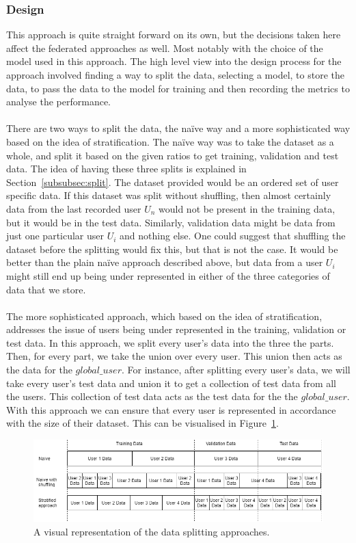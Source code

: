 \documentclass[12pt]{article}
\begin{document}
\subsubsection{Design}
This approach is quite straight forward on its own, but the decisions taken here affect the federated approaches as well. Most notably with the choice of the model used in this approach. The high level view into the design process for the approach involved finding a way to split the data, selecting a model, to store the data, to pass the data to the model for training and then recording the metrics to analyse the performance. 
\\\\
There are two ways to split the data, the na\"ive way and a more sophisticated way based on the idea of stratification. The na\"ive way was to take the dataset as a whole, and split it based on the given ratios to get training, validation and test data. The idea of having these three splits is explained in Section~\ref{subsubsec:split}. The dataset provided would be an ordered set of user specific data. If this dataset was split without shuffling, then almost certainly data from the last recorded user $U_n$ would not be present in the training data, but it would be in the test data. Similarly, validation data might be data from just one particular user $U_i$ and nothing else. One could suggest that shuffling the dataset before the splitting would fix this, but that is not the case. It would be better than the plain na\"ive approach described above, but data from a user $U_i$ might still end up being under represented in either of the three categories of data that we store.
\\\\
The more sophisticated approach, which based on the idea of stratification, addresses the issue of users being under represented in the training, validation or test data. In this approach, we split every user's data into the three the parts. Then, for every part, we take the union over every user. This union then acts as the data for the $global\_user$. For instance, after splitting every user's data, we will take every user's test data and union it to get a collection of test data from all the users. This collection of test data acts as the test data for the the $global\_user$. With this approach we can ensure that every user is represented in accordance with the size of their dataset. This can be visualised in Figure~\ref{fig:split}.
\begin{figure}[H]
	\centering
	\includegraphics[width=\linewidth]{resources/split.png}
	\caption{A visual representation of the data splitting approaches.}
	\label{fig:split}
\end{figure}
\end{document}
